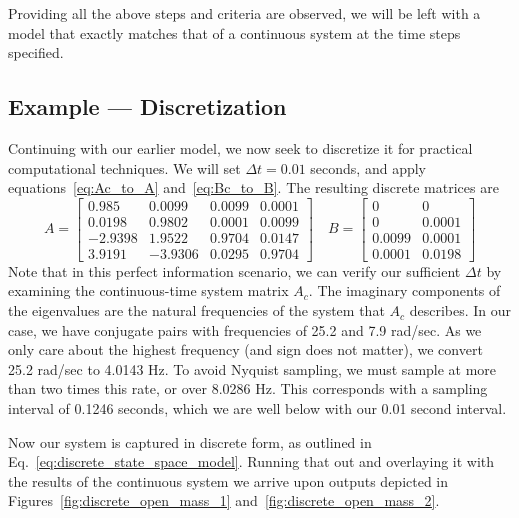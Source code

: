 Providing all the above steps and criteria are observed, we will be left with a model that exactly matches that of a continuous system at the time steps specified.

\FloatBarrier\subsection{Example --- Discretization} %
Continuing with our earlier model, we now seek to discretize it for practical computational techniques. We will set $\Delta t=0.01$ seconds, and apply equations~\ref{eq:Ac_to_A} and~\ref{eq:Bc_to_B}. The resulting discrete matrices are
\begin{equation}
    A = 
    \begin{bmatrix}
        0.985&0.0099&0.0099&0.0001\\0.0198&0.9802&0.0001&0.0099\\-2.9398&1.9522&0.9704&0.0147\\3.9191&-3.9306&0.0295&0.9704
    \end{bmatrix}
    \quad
    B = 
    \begin{bmatrix}
        0&0\\0&0.0001\\0.0099&0.0001\\0.0001&0.0198
    \end{bmatrix}
    \label{eq:discrete_A_B}
\end{equation}
Note that in this perfect information scenario, we can verify our sufficient $\Delta t$ by examining the continuous-time system matrix $A_c$. The imaginary components of the eigenvalues are the natural frequencies of the system that $A_c$ describes. In our case, we have conjugate pairs with frequencies of 25.2 and 7.9 rad/sec. As we only care about the highest frequency (and sign does not matter), we convert 25.2 rad/sec to 4.0143 Hz. To avoid Nyquist sampling, we must sample at more than two times this rate, or over 8.0286 Hz. This corresponds with a sampling interval of 0.1246 seconds, which we are well below with our 0.01 second interval.

Now our system is captured in discrete form, as outlined in Eq.~\ref{eq:discrete_state_space_model}. Running that out and overlaying it with the results of the continuous system we arrive upon outputs depicted in Figures~\ref{fig:discrete_open_mass_1} and~\ref{fig:discrete_open_mass_2}.

